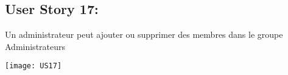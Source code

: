 \newpage{}
\subsection{User Story 17:}
Un administrateur peut ajouter ou supprimer des membres dans le groupe Administrateurs


  \begin{center}
        \texttt{[image: US17]}
  \end{center}